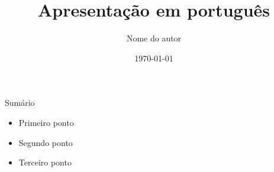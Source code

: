\documentclass{beamer}
\title{Apresentação em português}
\author{Nome do autor}
\date{\today}
\begin{document}
\begin{frame}
  \titlepage
\end{frame}

\begin{frame}{Sumário}
  \begin{itemize}
    \item Primeiro ponto
    \item Segundo ponto
    \item Terceiro ponto
  \end{itemize}
\end{frame}
\end{document}
